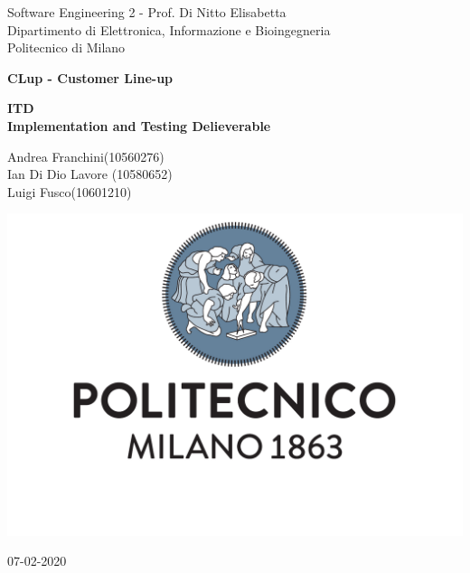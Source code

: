 \documentclass[
]{article}
\begin{document}
\begin{titlepage}
	\centering
    
    {\normalsize 
        Software Engineering 2 - Prof. Di Nitto Elisabetta \\ 
		Dipartimento di Elettronica, Informazione e Bioingegneria \\
        Politecnico di Milano \par
    }     \vspace{3cm}

    {\Huge \textbf{CLup - Customer Line-up\\} }    \vspace{1cm}
  
    {\large \textbf{ITD\\Implementation and Testing Delieverable} \par}     \vspace{4cm}

	{\normalsize Andrea Franchini(10560276) \\ Ian Di Dio Lavore (10580652)\\ Luigi Fusco(10601210)\par}     \vspace{3cm}

    \includegraphics[scale=0.4]{../DD/images/logo.pdf}
    \vspace{0.5cm}


	{\normalsize 07-02-2020 \par}
	
\end{titlepage}

\tableofcontents

\end{document}
